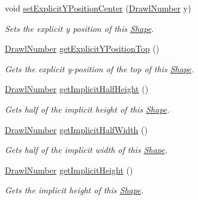 \begin{DoxyCompactItemize}
void \hyperlink{classcom_1_1aarrelaakso_1_1drawl_1_1_shape_a169bdd3220baa80ebb083b3b2db12546}{set\+Explicit\+Y\+Position\+Center} (\hyperlink{classcom_1_1aarrelaakso_1_1drawl_1_1_drawl_number}{Drawl\+Number} y)
\begin{DoxyCompactList}\small\item\em Sets the explicit y position of this \hyperlink{classcom_1_1aarrelaakso_1_1drawl_1_1_shape}{Shape}. \end{DoxyCompactList}\item 
\hyperlink{classcom_1_1aarrelaakso_1_1drawl_1_1_drawl_number}{Drawl\+Number} \hyperlink{classcom_1_1aarrelaakso_1_1drawl_1_1_shape_a95f8a2f107299d91813627a95b3e0f0f}{get\+Explicit\+Y\+Position\+Top} ()
\begin{DoxyCompactList}\small\item\em Gets the explicit y-\/position of the top of this \hyperlink{classcom_1_1aarrelaakso_1_1drawl_1_1_shape}{Shape}. \end{DoxyCompactList}\item 
\hyperlink{classcom_1_1aarrelaakso_1_1drawl_1_1_drawl_number}{Drawl\+Number} \hyperlink{classcom_1_1aarrelaakso_1_1drawl_1_1_shape_aa476150489a3a5b634a15a1c03e045d7}{get\+Implicit\+Half\+Height} ()
\begin{DoxyCompactList}\small\item\em Gets half of the implicit height of this \hyperlink{classcom_1_1aarrelaakso_1_1drawl_1_1_shape}{Shape}. \end{DoxyCompactList}\item 
\hyperlink{classcom_1_1aarrelaakso_1_1drawl_1_1_drawl_number}{Drawl\+Number} \hyperlink{classcom_1_1aarrelaakso_1_1drawl_1_1_shape_ac796f934debb4cf92d285f387422deb6}{get\+Implicit\+Half\+Width} ()
\begin{DoxyCompactList}\small\item\em Gets half of the implicit width of this \hyperlink{classcom_1_1aarrelaakso_1_1drawl_1_1_shape}{Shape}. \end{DoxyCompactList}\item 
\hyperlink{classcom_1_1aarrelaakso_1_1drawl_1_1_drawl_number}{Drawl\+Number} \hyperlink{classcom_1_1aarrelaakso_1_1drawl_1_1_shape_a41cc097acddea53404b62a812ef37276}{get\+Implicit\+Height} ()
\begin{DoxyCompactList}\small\item\em Gets the implicit height of this \hyperlink{classcom_1_1aarrelaakso_1_1drawl_1_1_shape}{Shape}. \end{DoxyCompactList}\item 

\end{DoxyCompactItemize}

